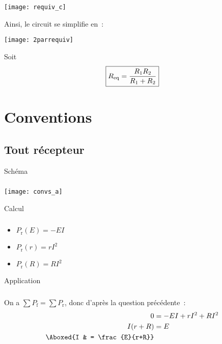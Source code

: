 \documentclass[a4paper, 12pt, final, garamond]{book}
\begin{document}
\begin{center}
    \texttt{[image: requiv\_c]}
\end{center}

Ainsi, le circuit se simplifie en~:
\begin{center}
    \texttt{[image: 2parrequiv]}
\end{center}
Soit
\[ \boxed{R_{\rm eq} = \frac{R_1R_2}{R_1 + R_2}}\]

\section{Conventions}
\subsection{Tout récepteur}
\begin{tcbraster}[raster columns=7, raster equal height=rows]
    \begin{NCdefi}[raster multicolumn=2]{Schéma}
        \subsubsection{}
        \vfill
        \begin{center}
            \texttt{[image: convs\_a]}
        \end{center}
        \vfill
    \end{NCdefi}
    \begin{NCrapp}[raster multicolumn=2]{Calcul}
        \subsubsection{}
        \vfill
        \begin{itemize}[leftmargin=20pt]
            \item $P_{\text{r}}(E) = -EI$
            \item $P_{\text{r}}(r) = rI^2$
            \item $P_{\text{r}}(R) = RI^2$
        \end{itemize}
        \vfill
    \end{NCrapp}
    \begin{NCexem}[raster multicolumn=3]{Application}
        \subsubsection{}
        On a $\sum P_{\text{f}} = \sum P_{\text{r}}$, donc d'après
        la question précédente~:
        \begin{align*}
            0         & = -EI + rI^2 + RI^2\\
            I(r+R)    & = E\\
            \Aboxed{I & = \frac{E}{r+R}}
        \end{align*}
    \end{NCexem}
\end{tcbraster}
\end{document}
